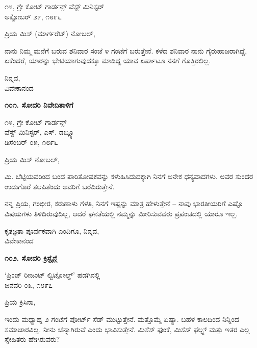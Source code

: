 \begin{flushright}
೧೪, ಗ್ರೇ ಕೋಟ್ ಗಾರ್ಡನ್ಸ್ ವೆಸ್ಟ್ ಮಿನಿಸ್ಟರ್\\ಅಕ್ಟೋಬರ್ ೨೯, ೧೮೯೬
\end{flushright}

ಪ್ರಿಯ ಮಿಸ್ (ಮಾರ್ಗರೆಟ್) ನೋಬಲ್,

ನಾನು ನಿಮ್ಮ ಮನೆಗೆ ಬರುವ ಶನಿವಾರ ಸಂಜೆ ೪ ಗಂಟೆಗೆ ಬರುತ್ತೇನೆ. ಕಳೆದ ಶನಿವಾರ ನಾನು ಗೈರುಹಾಜರಾಗಿದ್ದೆ, ಏಕೆಂದರೆ, ಯಾರನ್ನು ಭೇಟಿಯಾಗುವುದಕ್ಕೂ ಮಾಡಿದ್ದ ಯಾವ ಏರ್ಪಾಟೂ ನನಗೆ ಗೊತ್ತಿರಲಿಲ್ಲ.

\begin{flushright}
ನಿನ್ನವ,\\ವಿವೇಕಾನಂದ
\end{flushright}

\begin{center}
\textbf{೧೦೧. ಸೋದರಿ ನಿವೇದಿತಾಳಿಗೆ}
\end{center}

\begin{flushright}
೧೪, ಗ್ರೇ ಕೋಟ್ ಗಾರ್ಡನ್ಸ್\\ವೆಸ್ಟ್ ಮಿನಿಸ್ಟರ್, ಎಸ್. ಡಬ್ಲ್ಯೂ\\ಡಿಸೆಂಬರ್ ೦೫, ೧೮೯೬
\end{flushright}

ಪ್ರಿಯ ಮಿಸ್ ನೋಬಲ್,

ಮಿ. ಬೆಟ್ಟಿಯವರಿಂದ ಬಂದ ಪಾರಿತೋಷಕವನ್ನು ಕಳುಹಿಸಿದುದಕ್ಕಾಗಿ ನಿನಗೆ ಅನೇಕ ಧನ್ಯವಾದಗಳು. ಅವರ ಸುಂದರ ಉಡುಗೊರೆ ತಲಪಿತೆಂದು ಅವರಿಗೆ ಬರೆದಿರುತ್ತೇನೆ.

ನನ್ನ ಪ್ರಿಯ, ಗಂಭೀರ, ಕರುಣಾಳು ಗೆಳತಿ, ನಿನಗೆ ಇಷ್ಟನ್ನು ಮಾತ್ರ ಹೇಳುತ್ತೇನೆ – ನಾವು ಭಾರತೀಯರಿಗೆ ಎಷ್ಟೊ ವಿಷಯಗಳು ತಿಳಿದಿರುವುದಿಲ್ಲ, ಆದರೆ ಘನತೆಯಲ್ಲಿ ನಮ್ಮನ್ನು ಮೀರಿಸುವವರು ಪ್ರಪಂಚದಲ್ಲಿ ಯಾರೂ ಇಲ್ಲ.

\begin{flushright}
ಕೃತಜ್ಞತಾ ಪೂರ್ವಕವಾಗಿ ಎಂದಿಗೂ, ನಿನ್ನವ,\\ವಿವೇಕಾನಂದ
\end{flushright}

\begin{center}
\textbf{೧೦೨. ಸೋದರಿ ಕ್ರಿಸ್ಟೈನ್ಗೆ}
\end{center}

\begin{flushright}
‘ಪ್ರಿಂಜ್ ರೀಜಂಟ್ ಲ್ವಿಟ್ಪೋಲ್ಡ್’ ಹಡಗಿನಲ್ಲಿ\\ಜನವರಿ ೦೩, ೧೮೯೭
\end{flushright}

ಪ್ರಿಯ ಕ್ರಿಸಿನಾ,

ಇಂದು ಮಧ್ಯಾಹ್ನ ೨ ಗಂಟೆಗೆ ಪೋರ್ಟ್ ಸೆಡ್ ಮುಟ್ಟುತ್ತೇನೆ. ಮತ್ತೊಮ್ಮೆ ಏಷ್ಯಾ. ಬಹಳ ಕಾಲದಿಂದ ನಿನ್ನಿಂದ ಸಮಾಚಾರವಿಲ್ಲ. ನೀನು ಚೆನ್ನಾಗಿರುವೆ ಎಂದು ಭಾವಿಸುತ್ತೇನೆ. ಮಿಸೆಸ್ ಫುಂಕೆ, ಮಿಸೆಸ್ ಫೆಲ್ಪ್ಸ್ ಮತ್ತು ಇತರ ಎಲ್ಲ ಸ್ನೇಹಿತರು ಹೇಗಿರುವರು?

